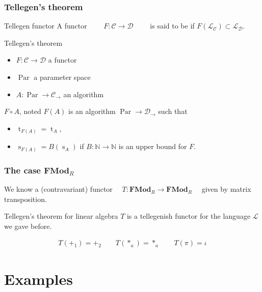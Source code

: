\documentclass[10pt]{beamer}
\newcommand{\cat}[1]{\mathscr{#1}}
\newcommand{\lcat}[1]{\mathbf{#1}}
\newcommand{\C}{\cat{C}}
\newcommand{\D}{\cat{D}}
\renewcommand{\L}{\cat{L}}
\newcommand{\comp}{\circ}
\newcommand{\N}{\mathbb{N}}
\newcommand{\ra}{\rightarrow}
\DeclareMathOperator{\Time}{t}
\DeclareMathOperator{\Space}{s}
\DeclareMathOperator{\Par}{Par}
\begin{document}
\begin{frame}
  \frametitle{Tellegen's theorem}

  \begin{block}{Tellegen functor}
    A functor $\qquad F:\C\ra\D \qquad$ is said to be
     if $F(\L_\C) \subset
    \L_\D$.
  \end{block}

  \begin{block}{Tellegen's theorem}
    \begin{itemize}
    \item $F:\C\ra\D$ a 
      functor
    \item $\Par$ a parameter space
    \item $A:\Par\ra\C_\ra$ an algorithm
    \end{itemize}

    $F\comp A$, noted $F(A)$ is an algorithm $\Par\ra\D_\ra$ such that
    \begin{itemize}
    \item $\Time_{F(A)} = \Time_A$,
    \item $\Space_{F(A)} = B(\Space_A)$ if $B:\N\ra\N$ is an upper
      bound for $F$.
    \end{itemize}
  \end{block}
\end{frame}


\begin{frame}
  \frametitle{The case $\lcat{FMod}_R$}
  
  \begin{center}
    We know a (contravariant) functor $\quad
    T:\lcat{FMod}_R\ra\lcat{FMod}_R\quad$ given by matrix
    transposition.
  \end{center}

  \begin{block}{Tellegen's theorem for linear algebra}
    $T$ is a tellegenish functor for the language $\L$ we gave before.
  \end{block}

  \begin{align*}
    T(+_1) = +_2 \qquad T(*_a) = *_a \qquad T(\pi) = \iota
  \end{align*}
\end{frame}



\section{Examples}
\end{document}
